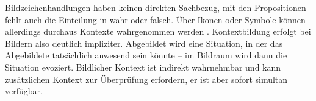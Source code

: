 Bildzeichenhandlungen haben keinen direkten Sachbezug, mit den Propositionen fehlt auch die Einteilung in wahr oder falsch. Über Ikonen oder Symbole können allerdings durchaus Kontexte wahrgenommen werden \cite[S. 31 f.]{001_MKO02_media-as-means-of-communication}. Kontextbildung erfolgt bei Bildern also deutlich impliziter. Abgebildet wird eine Situation, in der das Abgebildete tatsächlich anwesend sein könnte -- im Bildraum wird dann die Situation evoziert. \cite[S. 30]{001_MKO02_media-as-means-of-communication} Bildlicher Kontext ist indirekt wahrnehmbar und kann zusätzlichen Kontext zur Überprüfung erfordern, er ist aber sofort simultan verfügbar.